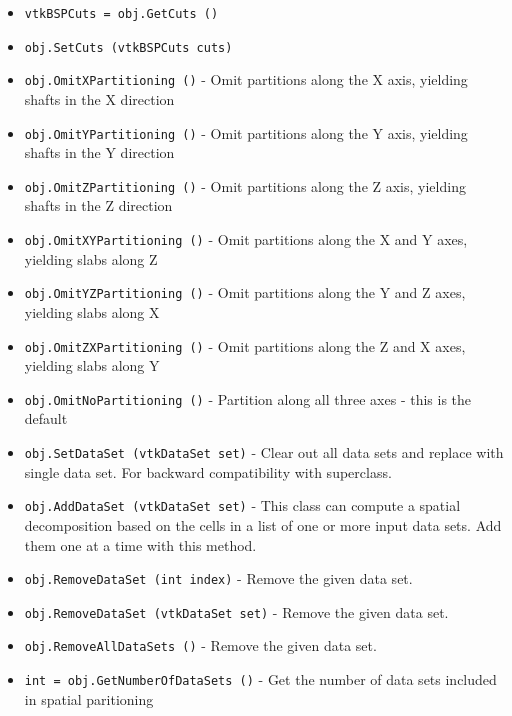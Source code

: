 \begin{itemize}
\item  \verb|vtkBSPCuts = obj.GetCuts ()|

\item  \verb|obj.SetCuts (vtkBSPCuts cuts)|

\item  \verb|obj.OmitXPartitioning ()| -     Omit partitions along the X axis, yielding shafts in the X direction

\item  \verb|obj.OmitYPartitioning ()| -     Omit partitions along the Y axis, yielding shafts in the Y direction

\item  \verb|obj.OmitZPartitioning ()| -     Omit partitions along the Z axis, yielding shafts in the Z direction

\item  \verb|obj.OmitXYPartitioning ()| -     Omit partitions along the X and Y axes, yielding slabs along Z

\item  \verb|obj.OmitYZPartitioning ()| -     Omit partitions along the Y and Z axes, yielding slabs along X

\item  \verb|obj.OmitZXPartitioning ()| -     Omit partitions along the Z and X axes, yielding slabs along Y

\item  \verb|obj.OmitNoPartitioning ()| -     Partition along all three axes - this is the default

\item  \verb|obj.SetDataSet (vtkDataSet set)| -  Clear out all data sets and replace with single data set.  For backward
 compatibility with superclass.

\item  \verb|obj.AddDataSet (vtkDataSet set)| -  This class can compute a spatial decomposition based on the cells in a list
 of one or more input data sets.  Add them one at a time with this method.

\item  \verb|obj.RemoveDataSet (int index)| -  Remove the given data set.

\item  \verb|obj.RemoveDataSet (vtkDataSet set)| -  Remove the given data set.

\item  \verb|obj.RemoveAllDataSets ()| -  Remove the given data set.

\item  \verb|int = obj.GetNumberOfDataSets ()| -    Get the number of data sets included in spatial paritioning


\end{itemize}
